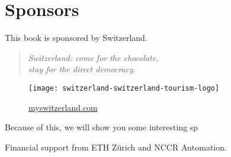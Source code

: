 \section{Sponsors}

This book is sponsored by Switzerland.

\begin{quote}
    \itshape
    Switzerland: come for the chocolate,\\
    stay for the direct democracy.
\end{quote}

\begin{figure}[h]
    \centering
    \texttt{[image: switzerland-switzerland-tourism-logo]}

    \href{http://myswitzerland.com}{myswitzerland.com}
\end{figure}

Because of this, we will show you some interesting sp

Financial support from ETH Zürich and NCCR Automation.
\begin{figure}[h]
    \centering

\end{figure}

